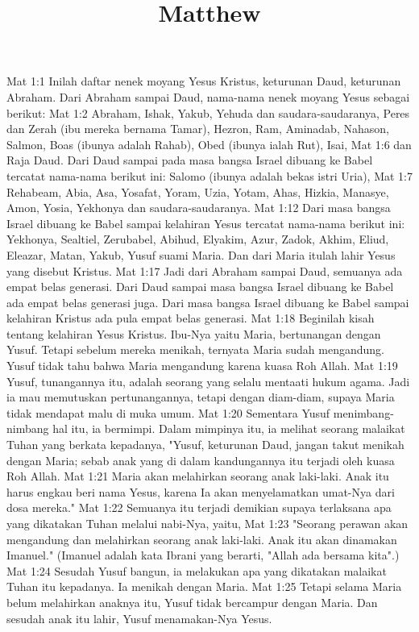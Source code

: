 

\title{Matthew}

Mat 1:1  Inilah daftar nenek moyang Yesus Kristus, keturunan Daud, keturunan Abraham. Dari Abraham sampai Daud, nama-nama nenek moyang Yesus sebagai berikut:
Mat 1:2  Abraham, Ishak, Yakub, Yehuda dan saudara-saudaranya, Peres dan Zerah (ibu mereka bernama Tamar), Hezron, Ram, Aminadab, Nahason, Salmon, Boas (ibunya adalah Rahab), Obed (ibunya ialah Rut), Isai,
Mat 1:6  dan Raja Daud. Dari Daud sampai pada masa bangsa Israel dibuang ke Babel tercatat nama-nama berikut ini: Salomo (ibunya adalah bekas istri Uria),
Mat 1:7  Rehabeam, Abia, Asa, Yosafat, Yoram, Uzia, Yotam, Ahas, Hizkia, Manasye, Amon, Yosia, Yekhonya dan saudara-saudaranya.
Mat 1:12  Dari masa bangsa Israel dibuang ke Babel sampai kelahiran Yesus tercatat nama-nama berikut ini: Yekhonya, Sealtiel, Zerubabel, Abihud, Elyakim, Azur, Zadok, Akhim, Eliud, Eleazar, Matan, Yakub, Yusuf suami Maria. Dan dari Maria itulah lahir Yesus yang disebut Kristus.
Mat 1:17  Jadi dari Abraham sampai Daud, semuanya ada empat belas generasi. Dari Daud sampai masa bangsa Israel dibuang ke Babel ada empat belas generasi juga. Dari masa bangsa Israel dibuang ke Babel sampai kelahiran Kristus ada pula empat belas generasi.
Mat 1:18  Beginilah kisah tentang kelahiran Yesus Kristus. Ibu-Nya yaitu Maria, bertunangan dengan Yusuf. Tetapi sebelum mereka menikah, ternyata Maria sudah mengandung. Yusuf tidak tahu bahwa Maria mengandung karena kuasa Roh Allah.
Mat 1:19  Yusuf, tunangannya itu, adalah seorang yang selalu mentaati hukum agama. Jadi ia mau memutuskan pertunangannya, tetapi dengan diam-diam, supaya Maria tidak mendapat malu di muka umum.
Mat 1:20  Sementara Yusuf menimbang-nimbang hal itu, ia bermimpi. Dalam mimpinya itu, ia melihat seorang malaikat Tuhan yang berkata kepadanya, "Yusuf, keturunan Daud, jangan takut menikah dengan Maria; sebab anak yang di dalam kandungannya itu terjadi oleh kuasa Roh Allah.
Mat 1:21  Maria akan melahirkan seorang anak laki-laki. Anak itu harus engkau beri nama Yesus, karena Ia akan menyelamatkan umat-Nya dari dosa mereka."
Mat 1:22  Semuanya itu terjadi demikian supaya terlaksana apa yang dikatakan Tuhan melalui nabi-Nya, yaitu,
Mat 1:23  "Seorang perawan akan mengandung dan melahirkan seorang anak laki-laki. Anak itu akan dinamakan Imanuel." (Imanuel adalah kata Ibrani yang berarti, "Allah ada bersama kita".)
Mat 1:24  Sesudah Yusuf bangun, ia melakukan apa yang dikatakan malaikat Tuhan itu kepadanya. Ia menikah dengan Maria.
Mat 1:25  Tetapi selama Maria belum melahirkan anaknya itu, Yusuf tidak bercampur dengan Maria. Dan sesudah anak itu lahir, Yusuf menamakan-Nya Yesus.
